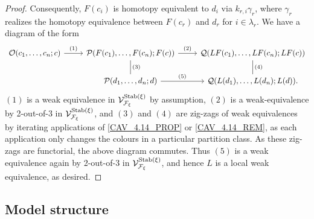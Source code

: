 \documentclass[psamsfonts,oneside,10pt,letterpaper
,draft
]{amsart}%
\renewcommand{\F}{\mathcal F}
\renewcommand{\1}{\ensuremath{\mathbb{id}}}
\renewcommand{\P}{\ensuremath{\mathcal{P}}}
\newcommand{\Q}{\ensuremath{\mathcal{Q}}}
\begin{document}
\begin{proof}
      Consequently, $F(c_i)$ is homotopy equivalent to $d_i$ via $k_{r,i}\gamma_r$,
      where $\gamma_r$ realizes the homotopy equivalence between $F(c_r)$ and $d_r$ for $i \in \lambda_r$.
      We have a diagram of the form
      \begin{equation}
            \label{TWOOFTHREE_EQ}
            \begin{tikzcd}
                  \O(c_1,\ldots, c_n;c) \arrow[r, "(1)"]
                  &
                  \P(F(c_1),\ldots, F(c_n); F(c)) \arrow[d,dash, "(3)"] \arrow[r, "(2)"]
                  &
                  \Q(LF(c_1),\ldots, LF(c_n);LF(c)) \arrow[d, dash, "(4)"]
                  \\
                  &
                  \P(d_1,\ldots, d_n;d) \arrow[r, "(5)"]
                  &
                  \Q(L(d_1),\ldots, L(d_n); L(d)).
            \end{tikzcd}
      \end{equation}
      $(1)$ is a weak equivalence in $\V^{\Stab(\ksi)}_{\F_\ksi}$ by assumption,
      $(2)$ is a weak-equivalence by 2-out-of-3 in $\V^{\Stab(\ksi)}_{\F_\ksi}$, and
      $(3)$ and $(4)$ are zig-zags of weak equivalences by iterating applications of \ref{CAV_4.14_PROP} or \ref{CAV_4.14_REM},
      as each application only changes the colours in a particular partition class.
      As these zig-zags are functorial, the above diagram commutes.
      Thus $(5)$ is a weak equivalence again by 2-out-of-3 in $\V^{\Stab(\ksi)}_{\F_\ksi}$, and hence
      $L$ is a local weak equivalence, as desired.
\end{proof}


\subsection{Model structure}
\end{document}
